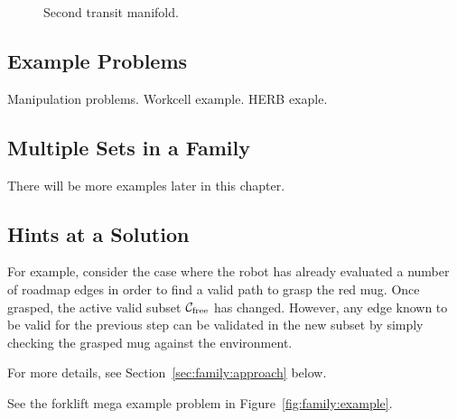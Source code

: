 \begin{figure}
   \centering
   \caption{Second transit manifold.}
\end{figure}


\subsection{Example Problems}

Manipulation problems.
Workcell example.
HERB exaple.

\subsection{Multiple Sets in a Family}

There will be more examples later in this chapter.

\subsection{Hints at a Solution}

For example,
consider the case where the robot has already evaluated a number
of roadmap edges in order to find a valid path to grasp the red mug.
Once grasped, the active valid subset $\mathcal{C}_{\mbox{\scriptsize free}}$
has changed.
However,
any edge known to be valid for the previous step
can be validated in the new subset by simply checking the grasped
mug against the environment.

For more details, see Section~\ref{sec:family:approach} below.

See the forklift mega example problem
in Figure~\ref{fig:family:example}.

